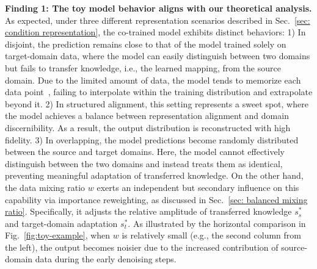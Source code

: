 \textbf{Finding 1: The toy model behavior aligns with our theoretical analysis.}
 As expected, under three different representation scenarios described in Sec.~\ref{sec: condition representation}, the co-trained model exhibits distinct behaviors: 
 1) In disjoint, the prediction remains close to that of the model trained solely on target-domain data, where the model can easily distinguish between two domains but fails to transfer knowledge, i.e., the learned mapping, from the source domain. Due to the limited amount of data, the model tends to memorize each data point~\cite{he2025demystifying}, failing to interpolate within the training distribution and extrapolate beyond it.
 2) In structured alignment, this setting represents a sweet spot, where the model achieves a balance between representation alignment and domain discernibility. As a result, the output distribution is reconstructed with high fidelity.
 3) In overlapping, the model predictions become randomly distributed between the source and target domains. Here, the model cannot effectively distinguish between the two domains and instead treats them as identical, preventing meaningful adaptation of transferred knowledge.
 On the other hand, the data mixing ratio $w$ exerts an independent but secondary influence on this capability via importance reweighting, as discussed in Sec.~\ref{sec: balanced mixing ratio}.
Specifically, it adjusts the relative amplitude of transferred knowledge $s^*_s$ and target-domain adaptation $s^*_t$.
As illustrated by the horizontal comparison in Fig.~\ref{fig:toy-example}, when $w$ is relatively small (e.g., the second column from the left), the output becomes noisier due to the increased contribution of source-domain data during the early denoising steps.

